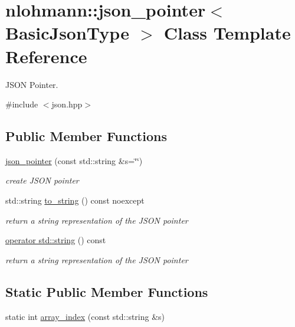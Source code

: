 \hypertarget{classnlohmann_1_1json__pointer}{}\section{nlohmann\+:\+:json\+\_\+pointer$<$ Basic\+Json\+Type $>$ Class Template Reference}
\label{classnlohmann_1_1json__pointer}


J\+S\+ON Pointer.  




{\ttfamily \#include $<$json.\+hpp$>$}

\subsection*{Public Member Functions}
\begin{DoxyCompactItemize}
\item 
\hyperlink{classnlohmann_1_1json__pointer_a7f32d7c62841f0c4a6784cf741a6e4f8}{json\+\_\+pointer} (const std\+::string \&s=\char`\"{}\char`\"{})
\begin{DoxyCompactList}\small\item\em create J\+S\+ON pointer \end{DoxyCompactList}\item 
std\+::string \hyperlink{classnlohmann_1_1json__pointer_ad7d3a3a215db8fe0964e644a918dcccb}{to\+\_\+string} () const noexcept
\begin{DoxyCompactList}\small\item\em return a string representation of the J\+S\+ON pointer \end{DoxyCompactList}\item 
\hyperlink{classnlohmann_1_1json__pointer_ae9015c658f99cf3d48a8563accc79988}{operator std\+::string} () const
\begin{DoxyCompactList}\small\item\em return a string representation of the J\+S\+ON pointer \end{DoxyCompactList}\end{DoxyCompactItemize}
\subsection*{Static Public Member Functions}
\begin{DoxyCompactItemize}
\item 
static int \hyperlink{classnlohmann_1_1json__pointer_ac53f5b79dd91da78743c437832f57ce4}{array\+\_\+index} (const std\+::string \&s)
\end{DoxyCompactItemize}
